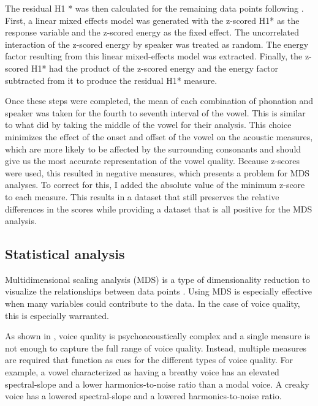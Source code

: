The residual H1 * was then calculated for the remaining data points following \citet{chaiH1H2AcousticMeasure2022}. First, a linear mixed effects model was generated with the z-scored H1* as the response variable and the z-scored energy as the fixed effect. The uncorrelated interaction of the z-scored energy by speaker was treated as random. The energy factor resulting from this linear mixed-effects model was extracted. Finally, the z-scored H1* had the product of the z-scored energy and the energy factor subtracted from it to produce the residual H1* measure. 

Once these steps were completed, the mean of each combination of phonation and speaker was taken for the fourth to seventh interval of the vowel. This is similar to what \citet{keatingCrosslanguageAcousticSpace2023} did by taking the middle of the vowel for their analysis. This choice minimizes the effect of the onset and offset of the vowel on the acoustic measures, which are more likely to be affected by the surrounding consonants and should give us the most accurate representation of the vowel quality. Because z-scores were used, this resulted in negative measures, which presents a problem for MDS analyses. To correct for this, I added the absolute value of the minimum z-score to each measure. This results in a dataset that still preserves the relative differences in the scores while providing a dataset that is all positive for the MDS analysis.

\subsection{Statistical analysis} \label{sec:acousticlandscape:statistics}

Multidimensional scaling analysis (MDS) is a type of dimensionality reduction to visualize the relationships between data points \citep{kruskalMultidimensionalScaling1978}. Using MDS is especially effective when many variables could contribute to the data. In the case of voice quality, this is especially warranted. 

As shown in \citet{kreimanUnifiedTheoryVoice2014,kreimanValidatingPsychoacousticModel2021,garellekAcousticDiscriminabilityComplex2020}, voice quality is psychoacoustically complex and a single measure is not enough to capture the full range of voice quality. Instead, multiple measures are required that function as cues for the different types of voice quality. For example, a vowel characterized as having a breathy voice has an elevated spectral-slope and a lower harmonics-to-noise ratio than a modal voice. A creaky voice has a lowered spectral-slope and a lowered harmonics-to-noise ratio. 


